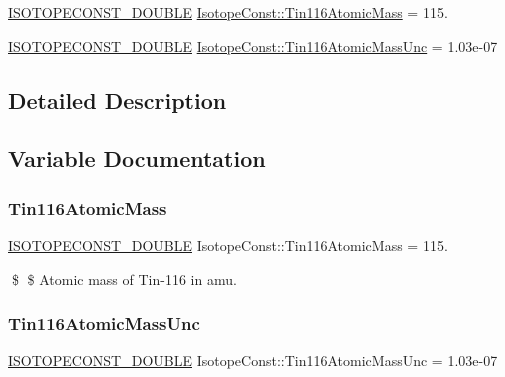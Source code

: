 \begin{DoxyCompactItemize}
\item 
\mbox{\hyperlink{group___isotope_const-_macros_ga8f45a7272ce02c0b4c65c44636ed719a}{I\+S\+O\+T\+O\+P\+E\+C\+O\+N\+S\+T\+\_\+\+D\+O\+U\+B\+LE}} \mbox{\hyperlink{group___isotope_const-_tin-_sn116_ga0cdb6329d862aeb18fea64db261d28f5}{Isotope\+Const\+::\+Tin116\+Atomic\+Mass}} = 115.
\item 
\mbox{\hyperlink{group___isotope_const-_macros_ga8f45a7272ce02c0b4c65c44636ed719a}{I\+S\+O\+T\+O\+P\+E\+C\+O\+N\+S\+T\+\_\+\+D\+O\+U\+B\+LE}} \mbox{\hyperlink{group___isotope_const-_tin-_sn116_ga99b814c4e83daf35d6b04f9aaae2ce9f}{Isotope\+Const\+::\+Tin116\+Atomic\+Mass\+Unc}} = 1.\+03e-\/07
\end{DoxyCompactItemize}


\subsection{Detailed Description}


\subsection{Variable Documentation}
\mbox{\label{group___isotope_const-_tin-_sn116_ga0cdb6329d862aeb18fea64db261d28f5}} 
\subsubsection{\texorpdfstring{Tin116\+Atomic\+Mass}{Tin116AtomicMass}}
{\footnotesize\ttfamily \mbox{\hyperlink{group___isotope_const-_macros_ga8f45a7272ce02c0b4c65c44636ed719a}{I\+S\+O\+T\+O\+P\+E\+C\+O\+N\+S\+T\+\_\+\+D\+O\+U\+B\+LE}} Isotope\+Const\+::\+Tin116\+Atomic\+Mass = 115.}

\$ \$ Atomic mass of Tin-\/116 in amu. \mbox{\label{group___isotope_const-_tin-_sn116_ga99b814c4e83daf35d6b04f9aaae2ce9f}} 
\subsubsection{\texorpdfstring{Tin116\+Atomic\+Mass\+Unc}{Tin116AtomicMassUnc}}
{\footnotesize\ttfamily \mbox{\hyperlink{group___isotope_const-_macros_ga8f45a7272ce02c0b4c65c44636ed719a}{I\+S\+O\+T\+O\+P\+E\+C\+O\+N\+S\+T\+\_\+\+D\+O\+U\+B\+LE}} Isotope\+Const\+::\+Tin116\+Atomic\+Mass\+Unc = 1.\+03e-\/07}

